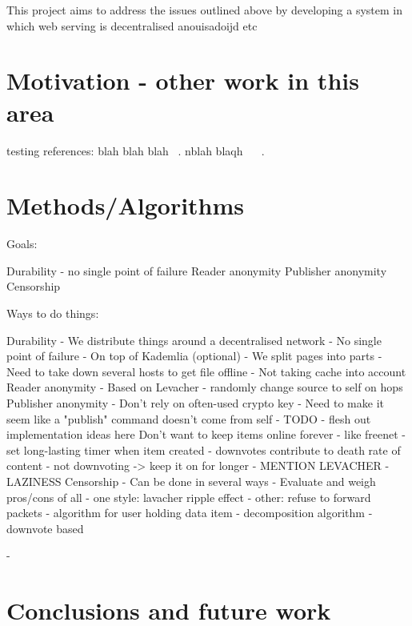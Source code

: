 \documentclass{article}
\begin{document}
This project aims to address the issues outlined above by developing a system in which web
serving is decentralised anouisadoijd etc

\section{Motivation - other work in this area}


testing references: blah blah blah ~\cite{blanchfield}. nblah blaqh ~\cite{levacher} ~\cite{freenet}.

\section{Methods/Algorithms}

Goals:

Durability - no single point of failure
Reader anonymity
Publisher anonymity
Censorship


Ways to do things:

Durability
    - We distribute things around a decentralised network
    - No single point of failure
    - On top of Kademlia (optional)
        - We split pages into parts
        - Need to take down several hosts to get file offline
        - Not taking cache into account
Reader anonymity
    - Based on Levacher - randomly change source to self on hops
Publisher anonymity
    - Don't rely on often-used crypto key
    - Need to make it seem like a "publish" command doesn't come from self
    - TODO - flesh out implementation ideas here
Don't want to keep items online forever
    - like freenet
    - set long-lasting timer when item created
    - downvotes contribute to death rate of content
    - not downvoting -> keep it on for longer
    - MENTION LEVACHER - LAZINESS 
Censorship
    - Can be done in several ways
    - Evaluate and weigh pros/cons of all
    - one style: lavacher ripple effect
    - other: refuse to forward packets
    - algorithm for user holding data item
        - decomposition algorithm
        - downvote based

    - 

\section{Conclusions and future work}

\newpage{}

\end{document}
